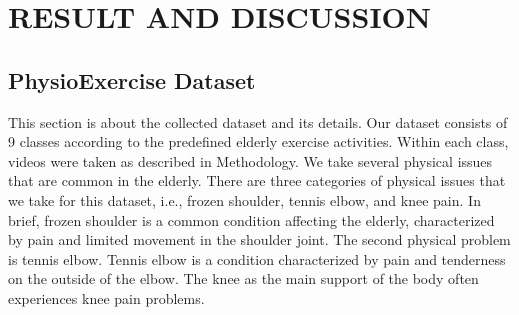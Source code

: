 \chapter{RESULT AND DISCUSSION}
\label{sec:chap4_result}
\section{PhysioExercise Dataset}
\label{sec4:dataset_evaluation}
This section is about the collected dataset and its details. Our dataset consists of 9 classes according to the predefined elderly exercise activities. Within each class, videos were taken as described in Methodology. We take several physical issues that are common in the elderly. There are three categories of physical issues that we take for this dataset, i.e., frozen shoulder, tennis elbow, and knee pain. In brief, frozen shoulder is a common condition affecting the elderly, characterized by pain and limited movement in the shoulder joint. The second physical problem is tennis elbow. Tennis elbow is a condition characterized by pain and tenderness on the outside of the elbow. The knee as the main support of the body often experiences knee pain problems.

